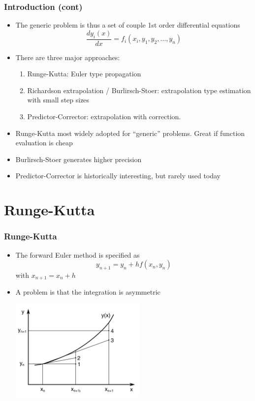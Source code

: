 \documentclass[10pt]{beamer}
\begin{document}
\begin{frame}
  \frametitle{Introduction (cont)}
  \begin{itemize}
  \item The generic problem is thus a set of couple 1st order differential equations
    \[
      \frac{d y_i(x)}{dx} = f_i(x_i, y_1, y_2, \ldots, y_n)
    \]
  \item There are three major approaches:
    \begin{enumerate}
    \item Runge-Kutta: Euler type propagation
    \item Richardson extrapolation / Burlirsch-Stoer: extrapolation type estimation with small step sizes
    \item Predictor-Corrector: extrapolation with correction. 
    \end{enumerate}
  \item Runge-Kutta most widely adopted for ``generic'' problems. Great if function evaluation is cheap
  \item Burlirsch-Stoer generates higher precision
  \item Predictor-Corrector is historically interesting, but rarely used today
  \end{itemize}
\end{frame}

\section{Runge-Kutta}

\begin{frame}
  \frametitle{Runge-Kutta}
  \begin{itemize}
  \item The forward Euler method is specified as
    \[
      y_{n+1} = y_n + h f( x_n, y_n )
    \]
    with $x_{n+1} = x_n + h$ 
  \item A problem is that the integration is asymmetric
    \centerline{\includegraphics[height=5cm]{12}}
  \end{itemize}
\end{frame}
\end{document}
